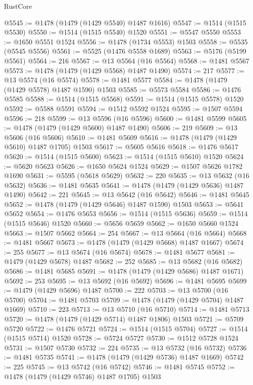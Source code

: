 \begin{lexlean}{RustCore}
\begin{coremodule}
@5545 := @1478 (@1479 (@1429 @5540) @1487 @1616)
@5547 := @1514 (@1515 @5530)
@5550 := @1514 (@1515 @5540) @1520
@5551 := @5547 @5550
@5553 := @1650 @5551 @1524
@5556 := @1478 (@1734 @5553) @1503
@5558 := @5535 (@5545 @5556)
@5561 := @5525 (@1476 @5558 @1689)
@5563 := @5176 (@5199 @5561)
@5564 := 216
@5567 := @13 @5564 (@16 @5564)
@5568 := @1481 @5567
@5573 := @1478 (@1479 (@1429 @5568) @1487 @1490)
@5574 := 217
@5577 := @13 @5574 (@16 @5574)
@5578 := @1481 @5577
@5584 := @1478 (@1479 (@1429 @5578) @1487 @1590) @1503
@5585 := @5573 @5584
@5586 := @1476 @5585
@5588 := @1514 (@1515 @5568)
@5591 := @1514 (@1515 @5578) @1520
@5592 := @5588 @5591
@5594 := @1512 @5592 @1524
@5595 := @1507 @5594
@5596 := 218
@5599 := @13 @5596 (@16 @5596)
@5600 := @1481 @5599
@5605 := @1478 (@1479 (@1429 @5600) @1487 @1490)
@5606 := 219
@5609 := @13 @5606 (@16 @5606)
@5610 := @1481 @5609
@5616 := @1478 (@1479 (@1429 @5610) @1487 @1705) @1503
@5617 := @5605 @5616
@5618 := @1476 @5617
@5620 := @1514 (@1515 @5600)
@5623 := @1514 (@1515 @5610) @1520
@5624 := @5620 @5623
@5626 := @1650 @5624 @1524
@5629 := @1507 @5626 @1782 @1690
@5631 := @5595 (@5618 @5629)
@5632 := 220
@5635 := @13 @5632 (@16 @5632)
@5636 := @1481 @5635
@5641 := @1478 (@1479 (@1429 @5636) @1487 @1490)
@5642 := 221
@5645 := @13 @5642 (@16 @5642)
@5646 := @1481 @5645
@5652 := @1478 (@1479 (@1429 @5646) @1487 @1590) @1503
@5653 := @5641 @5652
@5654 := @1476 @5653
@5656 := @1514 (@1515 @5636)
@5659 := @1514 (@1515 @5646) @1520
@5660 := @5656 @5659
@5662 := @1650 @5660 @1524
@5663 := @1507 @5662
@5664 := 254
@5667 := @13 @5664 (@16 @5664)
@5668 := @1481 @5667
@5673 := @1478 (@1479 (@1429 @5668) @1487 @1667)
@5674 := 255
@5677 := @13 @5674 (@16 @5674)
@5678 := @1481 @5677
@5681 := @1479 (@1429 @5678) @1487
@5682 := 252
@5685 := @13 @5682 (@16 @5682)
@5686 := @1481 @5685
@5691 := @1478 (@1479 (@1429 @5686) @1487 @1671)
@5692 := 253
@5695 := @13 @5692 (@16 @5692)
@5696 := @1481 @5695
@5699 := @1479 (@1429 @5696) @1487
@5700 := 222
@5703 := @13 @5700 (@16 @5700)
@5704 := @1481 @5703
@5709 := @1478 (@1479 (@1429 @5704) @1487 @1669)
@5710 := 223
@5713 := @13 @5710 (@16 @5710)
@5714 := @1481 @5713
@5720 := @1478 (@1479 (@1429 @5714) @1487 @1806) @1503
@5721 := @5709 @5720
@5722 := @1476 @5721
@5724 := @1514 (@1515 @5704)
@5727 := @1514 (@1515 @5714) @1520
@5728 := @5724 @5727
@5730 := @1512 @5728 @1524
@5731 := @1507 @5730
@5732 := 224
@5735 := @13 @5732 (@16 @5732)
@5736 := @1481 @5735
@5741 := @1478 (@1479 (@1429 @5736) @1487 @1669)
@5742 := 225
@5745 := @13 @5742 (@16 @5742)
@5746 := @1481 @5745
@5752 := @1478 (@1479 (@1429 @5746) @1487 @1705) @1503

\end{coremodule}
\end{lexlean}

